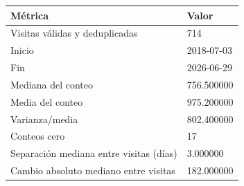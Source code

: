 \begin{tabular}{ll}
\toprule
Métrica & Valor \\
\midrule
Visitas válidas y deduplicadas & 714 \\
Inicio & 2018-07-03 \\
Fin & 2026-06-29 \\
Mediana del conteo & 756.500000 \\
Media del conteo & 975.200000 \\
Varianza/media & 802.400000 \\
Conteos cero & 17 \\
Separación mediana entre visitas (días) & 3.000000 \\
Cambio absoluto mediano entre visitas & 182.000000 \\
\bottomrule
\end{tabular}
